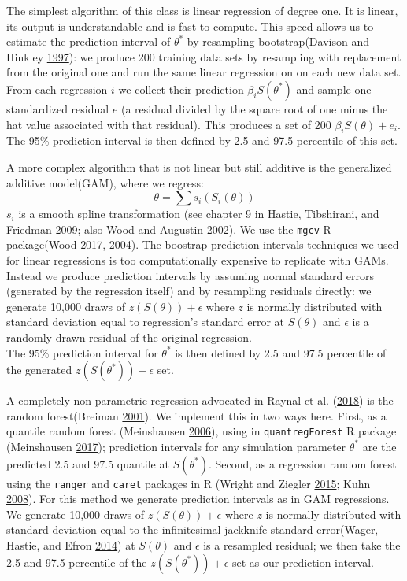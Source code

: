 \documentclass[]{article}
\begin{document}
The simplest algorithm of this class is linear regression of degree one.
It is linear, its output is understandable and is fast to compute.
This speed allows us to estimate the prediction interval of \(\theta^*\) by resampling bootstrap(Davison and Hinkley \protect\hyperlink{ref-Davison}{1997}): we produce 200 training data sets by resampling with replacement from the original one and run the same linear regression on on each new data set.
From each regression \(i\) we collect their prediction \(\beta_i S(\theta^*)\) and sample one standardized residual \(e\) (a residual divided by the square root of one minus the hat value associated with that residual).
This produces a set of 200 \(\beta_i S(\theta) + e_i\).
The 95\% prediction interval is then defined by 2.5 and 97.5 percentile of this set.

A more complex algorithm that is not linear but still additive is the generalized additive model(GAM), where we regress:
\[ \theta = \sum s_i(S_i(\theta)) \]
\(s_i\) is a smooth spline transformation (see chapter 9 in Hastie, Tibshirani, and Friedman \protect\hyperlink{ref-friedman_elements_2001}{2009}; also Wood and Augustin \protect\hyperlink{ref-Wood2002}{2002}).
We use the \texttt{mgcv} R package(Wood \protect\hyperlink{ref-Wood2017}{2017}, \protect\hyperlink{ref-Wood2004}{2004}).
The boostrap prediction intervals techniques we used for linear regressions is too computationally expensive to replicate with GAMs.
Instead we produce prediction intervals by assuming normal standard errors (generated by the regression itself) and by resampling residuals directly: we generate 10,000 draws of \(z(S(\theta))+\epsilon\) where \(z\) is normally distributed with standard deviation equal to regression's standard error at \(S(\theta)\) and \(\epsilon\) is a randomly drawn residual of the original regression.\\
The 95\% prediction interval for \(\theta^*\) is then defined by 2.5 and 97.5 percentile of the generated \(z(S(\theta^*))+\epsilon\) set.

A completely non-parametric regression advocated in Raynal et al. (\protect\hyperlink{ref-MarixnArxiv}{2018}) is the random forest(Breiman \protect\hyperlink{ref-Breiman2001}{2001}).
We implement this in two ways here.
First, as a quantile random forest (Meinshausen \protect\hyperlink{ref-Meinshausen2006}{2006}), using in \texttt{quantregForest} R package (Meinshausen \protect\hyperlink{ref-Meinshausen2017}{2017}); prediction intervals for any simulation parameter \(\theta^*\) are the predicted 2.5 and 97.5 quantile at \(S(\theta^*)\).
Second, as a regression random forest using the \texttt{ranger} and \texttt{caret} packages in R (Wright and Ziegler \protect\hyperlink{ref-Wright2015}{2015}; Kuhn \protect\hyperlink{ref-Kuhn2008}{2008}).
For this method we generate prediction intervals as in GAM regressions.
We generate 10,000 draws of \(z(S(\theta))+\epsilon\) where \(z\) is normally distributed with standard deviation equal to the infinitesimal jackknife standard error(Wager, Hastie, and Efron \protect\hyperlink{ref-Wager2014}{2014}) at \(S(\theta)\) and \(\epsilon\) is a resampled residual; we then take the 2.5 and 97.5 percentile of the \(z(S(\theta^*))+\epsilon\) set as our prediction interval.
\end{document}
